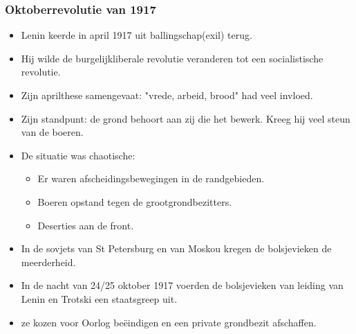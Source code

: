 \documentclass{article}
\begin{document}
\subsubsection{Oktoberrevolutie van 1917}
\begin{itemize}
    \item Lenin keerde in april 1917 uit ballingschap(exil) terug.
    \item Hij wilde de burgelijkliberale revolutie veranderen tot een socialistische revolutie.
    \item Zijn aprilthese samengevaat: "vrede, arbeid, brood" had veel invloed.
    \item Zijn standpunt: de grond behoort aan zij die het bewerk. Kreeg hij veel steun van de boeren.
    \item De situatie was chaotische: 
    \begin{itemize}
        \item Er waren afscheidingsbewegingen in de randgebieden.
        \item Boeren opstand tegen de grootgrondbezitters.
        \item Deserties aan de front.
    \end{itemize}
    \item In de sovjets van St Petersburg en van Moskou kregen de bolsjevieken de meerderheid.
    \item In de nacht van 24/25 oktober 1917 voerden de bolsjevieken van leiding van Lenin en Trotski een staatsgreep uit.
    \item ze kozen voor Oorlog beëindigen en een private grondbezit afschaffen.
\end{itemize}
\end{document}
